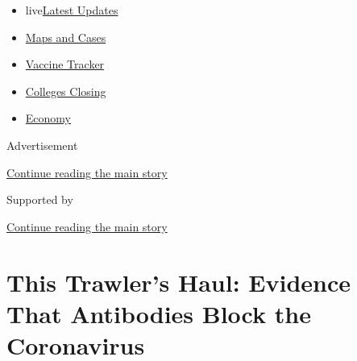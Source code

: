 \begin{itemize}
\tightlist
\item
  live\href{https://www.nytimes3xbfgragh.onion/2020/08/20/world/coronavirus-covid.html?name=styln-coronavirus-national\&region=TOP_BANNER\&variant=undefined\&block=storyline_menu_recirc\&action=click\&pgtype=Article\&impression_id=25d88401-e38a-11ea-8685-3704dba1db43}{Latest
  Updates}
\item
  \href{https://www.nytimes3xbfgragh.onion/interactive/2020/us/coronavirus-us-cases.html?name=styln-coronavirus-national\&region=TOP_BANNER\&variant=undefined\&block=storyline_menu_recirc\&action=click\&pgtype=Article\&impression_id=25d88402-e38a-11ea-8685-3704dba1db43}{Maps
  and Cases}
\item
  \href{https://www.nytimes3xbfgragh.onion/interactive/2020/science/coronavirus-vaccine-tracker.html?name=styln-coronavirus-national\&region=TOP_BANNER\&variant=undefined\&block=storyline_menu_recirc\&action=click\&pgtype=Article\&impression_id=25d88403-e38a-11ea-8685-3704dba1db43}{Vaccine
  Tracker}
\item
  \href{https://www.nytimes3xbfgragh.onion/2020/08/19/us/colleges-closing-covid.html?name=styln-coronavirus-national\&region=TOP_BANNER\&variant=undefined\&block=storyline_menu_recirc\&action=click\&pgtype=Article\&impression_id=25d88404-e38a-11ea-8685-3704dba1db43}{Colleges
  Closing}
\item
  \href{https://www.nytimes3xbfgragh.onion/live/2020/08/20/business/stock-market-today-coronavirus?name=styln-coronavirus-national\&region=TOP_BANNER\&variant=undefined\&block=storyline_menu_recirc\&action=click\&pgtype=Article\&impression_id=25d88405-e38a-11ea-8685-3704dba1db43}{Economy}
\end{itemize}

Advertisement

\protect\hyperlink{after-top}{Continue reading the main story}

Supported by

\protect\hyperlink{after-sponsor}{Continue reading the main story}

\hypertarget{this-trawlers-haul-evidence-that-antibodies-block-the-coronavirus}{%
\section{This Trawler's Haul: Evidence That Antibodies Block the
Coronavirus}\label{this-trawlers-haul-evidence-that-antibodies-block-the-coronavirus}}

